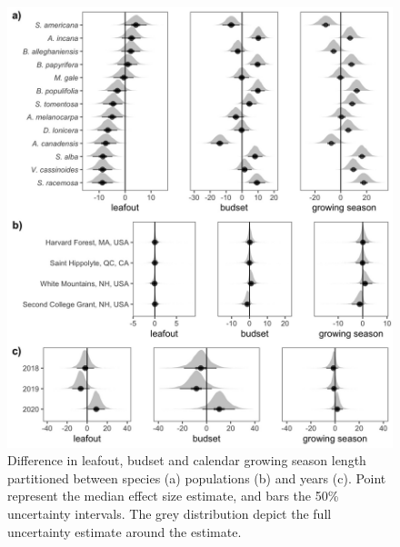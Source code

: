 \documentclass{article}[12pt]
\begin{document}
\begin{figure}[h!]
    \centering
 \includegraphics[width=.7\textwidth]{..//analyses/figures/var_parts.jpeg}
    \caption{Difference in leafout, budset and calendar growing season length partitioned between species (a) populations (b) and years (c). Point represent the median effect size estimate, and bars the 50\% uncertainty intervals. The grey distribution depict the full uncertainty estimate around the estimate.}
    \label{fig:vapar}
\end{figure}
\end{document}
